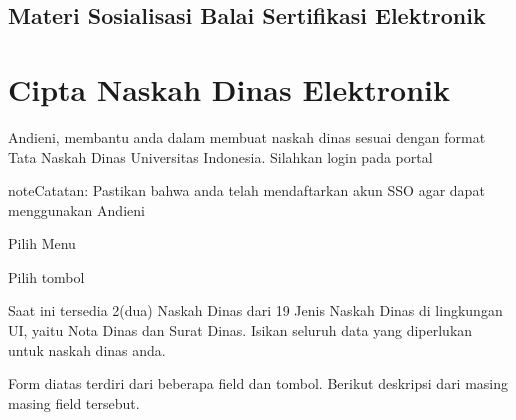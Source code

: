 \documentclass[letterpaper,10pt,bahasai]{sphinxmanual}
\begin{document}
\section{Materi Sosialisasi Balai Sertifikasi Elektronik}
\label{\detokenize{daftar_eSign:materi-sosialisasi-balai-sertifikasi-elektronik}}



\chapter{Cipta Naskah Dinas Elektronik}
\label{\detokenize{ciptanaskah:cipta-naskah-dinas-elektronik}}\label{\detokenize{ciptanaskah::doc}}
Andieni, membantu anda dalam membuat naskah dinas sesuai dengan format Tata Naskah Dinas Universitas Indonesia. Silahkan
login pada portal 

\noindent{}

\begin{sphinxadmonition}{note}{Catatan:}
Pastikan bahwa anda telah mendaftarkan akun SSO agar dapat menggunakan Andieni
\end{sphinxadmonition}

Pilih Menu 

\noindent{}

Pilih tombol 

\noindent{}

Saat ini tersedia 2(dua)  Naskah Dinas dari 19 Jenis Naskah Dinas di lingkungan UI, yaitu Nota Dinas dan Surat Dinas.
Isikan seluruh data yang diperlukan untuk  naskah dinas anda.

\noindent{}

Form diatas terdiri dari beberapa field dan tombol. Berikut deskripsi dari masing masing field tersebut.
\end{document}

